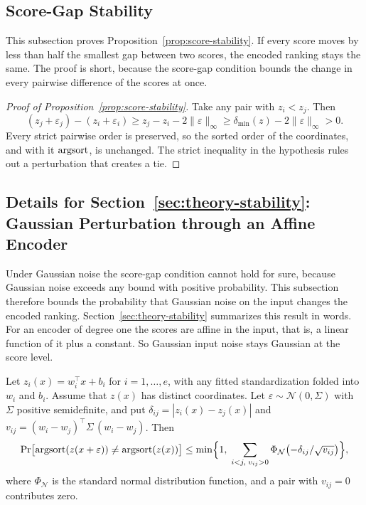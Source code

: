 \subsection{Score-Gap Stability}

This subsection proves Proposition~\ref{prop:score-stability}. If every score moves by less than half the smallest gap between two scores, the encoded ranking stays the same. The proof is short, because the score-gap condition bounds the change in every pairwise difference of the scores at once.

\begin{proof}[Proof of Proposition~\ref{prop:score-stability}]
Take any pair with $z_i<z_j$. Then
\[
(z_j+\varepsilon_j)-(z_i+\varepsilon_i)\ge z_j-z_i-2\|\varepsilon\|_\infty\ge\delta_{\min}(z)-2\|\varepsilon\|_\infty>0 .
\]
Every strict pairwise order is preserved, so the sorted order of the coordinates, and with it $\mathrm{argsort}$, is unchanged. The strict inequality in the hypothesis rules out a perturbation that creates a tie.
\end{proof}

\subsection{Details for Section~\ref*{sec:theory-stability}: Gaussian Perturbation through an Affine Encoder}\label{supp:gaussian}

Under Gaussian noise the score-gap condition cannot hold for sure, because Gaussian noise exceeds any bound with positive probability. This subsection therefore bounds the probability that Gaussian noise on the input changes the encoded ranking. Section~\ref{sec:theory-stability} summarizes this result in words. For an encoder of degree one the scores are affine in the input, that is, a linear function of it plus a constant. So Gaussian input noise stays Gaussian at the score level.

\begin{proposition}\label{prop:gaussian-stability}
Let $z_i(x)=w_i^{\top}x+b_i$ for $i=1,\dots,e$, with any fitted standardization folded into $w_i$ and $b_i$. Assume that $z(x)$ has distinct coordinates. Let $\varepsilon\sim\mathcal N(0,\Sigma)$ with $\Sigma$ positive semidefinite, and put $\delta_{ij}=|z_i(x)-z_j(x)|$ and $v_{ij}=(w_i-w_j)^{\top}\Sigma\,(w_i-w_j)$. Then
\begin{equation}\label{eq:gaussian-pair-bound}
\Pr\bigl[\mathrm{argsort}(z(x+\varepsilon))\neq\mathrm{argsort}(z(x))\bigr]
\le\min\Bigl\{1,\;\sum_{i<j,\;v_{ij}>0}\Phi_{\mathcal N}\bigl(-\delta_{ij}/\sqrt{v_{ij}}\bigr)\Bigr\},
\end{equation}
where $\Phi_{\mathcal N}$ is the standard normal distribution function, and a pair with $v_{ij}=0$ contributes zero.
\end{proposition}

